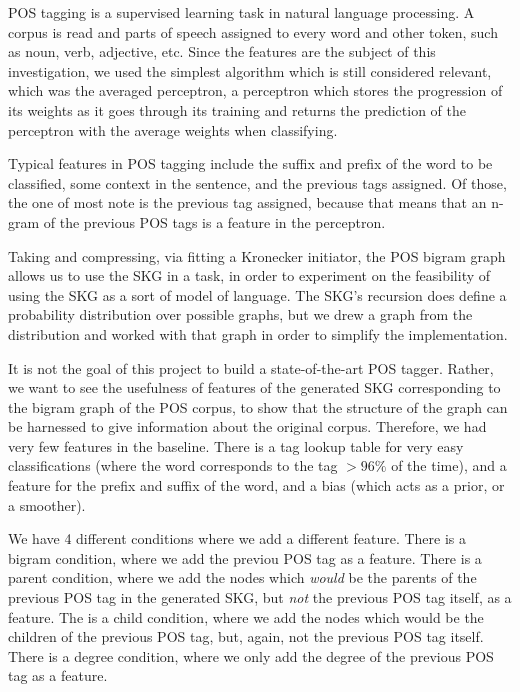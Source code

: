 \documentclass[12pt]{article}
\begin{document}
POS tagging is a supervised learning task in natural language processing. A corpus is read and parts of speech assigned to every word and other token, such as noun, verb, adjective, etc. Since the features are the subject of this investigation, we used the simplest algorithm which is still considered relevant, which was the averaged perceptron, a perceptron which stores the progression of its weights as it goes through its training and returns the prediction of the perceptron with the average weights when classifying. %

Typical features in POS tagging include the suffix and prefix of the word to be classified, some context in the sentence, and the previous tags assigned. Of those, the one of most note is the previous tag assigned, because that means that an n-gram of the previous POS tags is a feature in the perceptron. %

Taking and compressing, via fitting a Kronecker initiator, the POS bigram graph allows us to use the SKG in a task, in order to experiment on the feasibility of using the SKG as a sort of model of language. The SKG's recursion does define a probability distribution over possible graphs, but we drew a graph from the distribution and worked with that graph in order to simplify the implementation.

It is not the goal of this project to build a state-of-the-art POS tagger. Rather, we want to see the usefulness of features of the generated SKG corresponding to the bigram graph of the POS corpus, to show that the structure of the graph can be harnessed to give information about the original corpus. Therefore, we had very few features in the baseline. There is a tag lookup table for very easy classifications (where the word corresponds to the tag $>96\%$ of the time), and a feature for the prefix and suffix of the word, and a bias (which acts as a prior, or a smoother).

We have 4 different conditions where we add a different feature. There is a bigram condition, where we add the previou POS tag as a feature. There is a parent condition, where we add the nodes which \emph{would} be the parents of the previous POS tag in the generated SKG, but \emph{not} the previous POS tag itself, as a feature. The is a child condition, where we add the nodes which would be the children of the previous POS tag, but, again, not the previous POS tag itself. There is a degree condition, where we only add the degree of the previous POS tag as a feature. %
\end{document}
